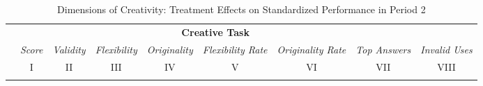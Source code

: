 \begin{landscape}
\begin{table}
\caption{Dimensions of Creativity: Treatment Effects on Standardized Performance in Period 2}
\begin{center}%
{\small\renewcommand{\arraystretch}{0.9}%
\begin{tabular}{lcccccccc}
\hline\hline\noalign{\smallskip}
 &     \multicolumn{7}{c}{\bf Creative Task}  &\\
&    \it Score &  \it Validity  &  \it Flexibility & \it Originality & \it Flexibility Rate  & \it Originality Rate  & \it Top Answers & \it Invalid Uses   \\
&          I       &      II         &       III         &       IV          &     V     & VI & VII & VIII      \\
\hline\noalign{\smallskip}		


\end{tabular}}
\end{center}
\end{table}
\end{landscape}
